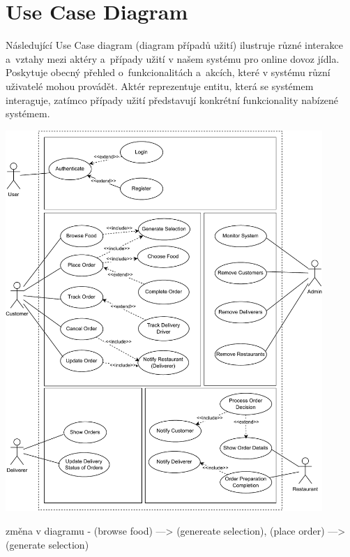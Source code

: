 \section{Use Case Diagram}

Následující Use Case diagram (diagram případů užití) ilustruje různé interakce a~vztahy mezi aktéry a~případy užití v našem systému pro online dovoz jídla. Poskytuje obecný přehled o~funkcionalitách a~akcích, které v systému různí uživatelé mohou provádět. Aktér reprezentuje entitu, která se systémem interaguje, zatímco případy užití představují konkrétní funkcionality nabízené systémem.

\begin{center}
	\includegraphics[width=0.9\textwidth]{assets/swihphat.drawio.pdf}
\end{center}

{\color{red} \footnotesize{} změna v diagramu - (browse food) ---> (genereate selection), (place order) ---> (generate selection)}

\pagebreak
